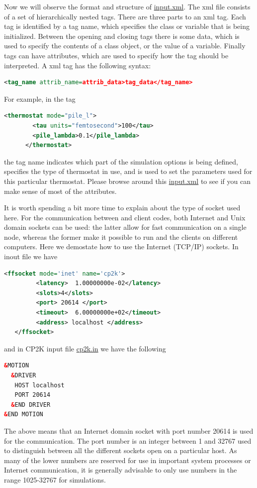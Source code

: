 \documentclass{article}
\begin{document}
\begin{Exercise}[label={inputs},title={Keywords, outputs, and units of \ipi{}}]
\Question
Now we will observe the format and structure of \url{input.xml}.
The xml file consists of a set of hierarchically nested tags. There are three
parts to an xml tag. Each tag is identified by a tag name, which specifies the class
or variable that is being initialized. Between the opening and closing tags there is some data, 
which is used to specify the
contents of a class object, or the value of a variable. Finally tags can have attributes,
which are used to specify how the tag should be interpreted.
A xml tag has the following syntax:
\begin{lstlisting}[language=xml]
<tag_name attrib_name=attrib_data>tag_data</tag_name>
\end{lstlisting}
For example, in the tag
\begin{lstlisting}[language=xml]
      <thermostat mode="pile_l">
        <tau units="femtosecond">100</tau> 
        <pile_lambda>0.1</pile_lambda>
      </thermostat>
\end{lstlisting}
the tag name  indicates which part of the simulation options is being defined,
 specifies the type of thermostat in use,
and  is used to set the parameters used for this particular thermostat.
Please browse around this \url{input.xml} to see if you can make sense of most of the attributes.

\Question
It is worth spending a bit more time to explain about the type of socket used here.
For the communication between \ipi{} and client codes, both Internet and Unix domain sockets can be used: the
latter allow for fast communication on a single node, whereas the former make it possible
to run \ipi{} and the clients on different computers.
Here we demostate how to use the Internet (TCP/IP) sockets.
In \ipi{} inout file we have
\begin{lstlisting}[language=xml]
    <ffsocket mode='inet' name='cp2k'>
         <latency>  1.00000000e-02</latency>
         <slots>4</slots>
         <port> 20614 </port>
         <timeout>  6.00000000e+02</timeout>
         <address> localhost </address>
   </ffsocket> 
\end{lstlisting}
and in CP2K input file \url{cp2k.in} we have the following
\begin{lstlisting}[language=xml]
&MOTION
  &DRIVER
   HOST localhost
   PORT 20614
  &END DRIVER
&END MOTION
\end{lstlisting}
The above means that an Internet domain socket with port number 20614 is used for the communication.
The port number is an integer between 1 and 32767 used to distinguish between all the
different sockets open on a particular host. As many of the lower numbers are reserved
for use in important system processes or Internet communication, it is generally advisable
to only use numbers in the range 1025-32767 for simulations.


\end{Exercise}
\end{document}
